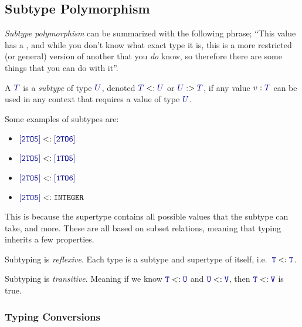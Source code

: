 \subsection{Subtype Polymorphism}\label{subsec:Subtype_Polymorphism}
\begin{definition}\label{def:Subtype_Polymorphism}
  \emph{Subtype polymorphism} can be summarized with the following phrase; ``This value has a , and while you don't know what exact type it is, this  is a more restricted (or general) version of another  that you \textit{do} know, so therefore there are some things that you can do with it''.
\end{definition}

\begin{definition}[Subtype]\label{def:Subtype}
  A  $\SemanticType{T}$ is a \emph{subtype} of type $\SemanticType{U}$, denoted $\SemanticType{T} <: \SemanticType{U}$ or $\SemanticType{U} :> \SemanticType{T}$, if any value $v : \SemanticType{T}$ can be used in any context that requires a value of type $\SemanticType{U}$.

  Some examples of subtypes are:
  \begin{itemize}[noitemsep]
  \item $\mathtt{\SemanticType{[2 TO 5]}} <: \mathtt{\SemanticType{[2 TO 6]}}$
  \item $\mathtt{\SemanticType{[2 TO 5]}} <: \mathtt{\SemanticType{[1 TO 5]}}$
  \item $\mathtt{\SemanticType{[2 TO 5]}} <: \mathtt{\SemanticType{[1 TO 6]}}$
  \item $\mathtt{\SemanticType{[2 TO 5]}} <: \mathtt{INTEGER}$
  \end{itemize}

  This is because the supertype contains all possible values that the subtype can take, and more.
  These are all based on subset relations, meaning that typing inherits a few properties.
  \begin{propertylist}
  \item Subtyping is \emph{reflexive}. Each type  is a subtype and supertype of itself, i.e.\ $\mathtt{\SemanticType{T}} <: \mathtt{\SemanticType{T}}$.\label{prop:Subtype_Reflexive}
  \item Subtyping is \emph{transitive}. Meaning if we know $\mathtt{\SemanticType{T}} <: \mathtt{\SemanticType{U}}$ and $\mathtt{\SemanticType{U}} <: \mathtt{\SemanticType{V}}$, then $\mathtt{\SemanticType{T}} <: \mathtt{\SemanticType{V}}$ is true.\label{prop:Subtype_Transitive}
  \end{propertylist}
\end{definition}

\subsubsection{Typing Conversions}\label{subsubsec:Typing_Conversions}


